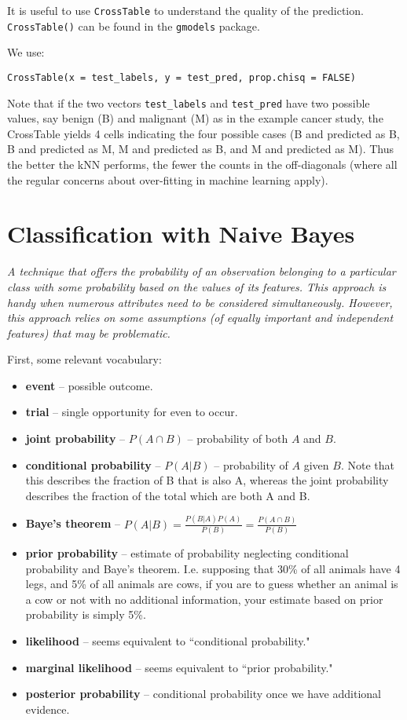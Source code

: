\documentclass[]{article}
\begin{document}
It is useful to use \verb|CrossTable| to understand the quality of the prediction.  \verb|CrossTable()| can be found in the \verb|gmodels| package.

We use: 
\begin{verbatim}
CrossTable(x = test_labels, y = test_pred, prop.chisq = FALSE)
\end{verbatim}
Note that if the two vectors \verb|test_labels| and \verb|test_pred| have two possible values, say benign (B) and malignant (M) as in the example cancer study, the CrossTable yields 4 cells indicating the four possible cases (B and predicted as B, B and predicted as M, M and predicted as B, and M and predicted as M).  Thus the better the kNN performs, the fewer the counts in the off-diagonals (where all the regular concerns about over-fitting in machine learning apply).  

\section{Classification with Naive Bayes}

\emph{A technique that offers the probability of an observation belonging to a particular class with some probability based on the values of its features.  This approach is handy when numerous attributes need to be considered simultaneously.  However, this approach relies on some assumptions (of equally important and independent features) that may be problematic.}

First, some relevant vocabulary:
\begin{itemize}
\item \textbf{event} -- possible outcome.
\item \textbf{trial} -- single opportunity for even to occur.
\item \textbf{joint probability} -- $P(A \cap B)$ -- probability of both $A$ and $B$.
\item \textbf{conditional probability} -- $P(A|B)$ -- probability of $A$ given $B$.  Note that this describes the fraction of B that is also A, whereas the joint probability describes the fraction of the total which are both A and B.
\item \textbf{Baye's theorem} -- $P(A|B) = \frac{P(B|A)P(A)}{P(B)} = \frac{P(A \cap B)}{P(B)}$
\item \textbf{prior probability} -- estimate of probability neglecting conditional probability and Baye's theorem.  I.e. supposing that 30\% of all animals have 4 legs, and 5\% of all animals are cows, if you are to guess whether an animal is a cow or not with no additional information, your estimate based on prior probability is simply 5\%.
\item \textbf{likelihood} -- seems equivalent to ``conditional probability."
\item \textbf{marginal likelihood} -- seems equivalent to ``prior probability."
\item \textbf{posterior probability} -- conditional probability once we have additional evidence.
\end{itemize}
\end{document}

